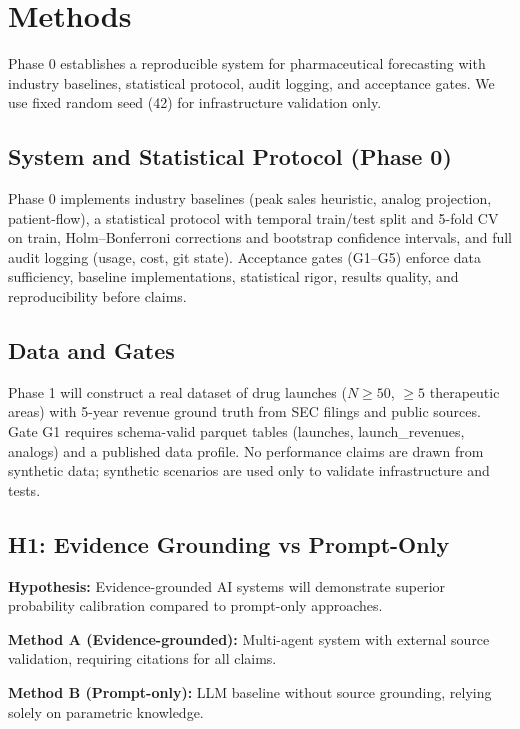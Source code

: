 \documentclass{article}
\begin{document}
\section{Methods}

Phase 0 establishes a reproducible system for pharmaceutical forecasting with industry baselines, statistical protocol, audit logging, and acceptance gates. We use fixed random seed (42) for infrastructure validation only.

\subsection{System and Statistical Protocol (Phase 0)}

Phase 0 implements industry baselines (peak sales heuristic, analog projection, patient-flow), a statistical protocol with temporal train/test split and 5-fold CV on train, Holm--Bonferroni corrections and bootstrap confidence intervals, and full audit logging (usage, cost, git state). Acceptance gates (G1--G5) enforce data sufficiency, baseline implementations, statistical rigor, results quality, and reproducibility before claims.

\subsection{Data and Gates}

Phase 1 will construct a real dataset of drug launches (\(N\geq 50\), \(\geq 5\) therapeutic areas) with 5-year revenue ground truth from SEC filings and public sources. Gate G1 requires schema-valid parquet tables (launches, launch\_revenues, analogs) and a published data profile. No performance claims are drawn from synthetic data; synthetic scenarios are used only to validate infrastructure and tests.

\subsection{H1: Evidence Grounding vs Prompt-Only}

\textbf{Hypothesis:} Evidence-grounded AI systems will demonstrate superior probability calibration compared to prompt-only approaches.

\textbf{Method A (Evidence-grounded):} Multi-agent system with external source validation, requiring citations for all claims.

\textbf{Method B (Prompt-only):} LLM baseline without source grounding, relying solely on parametric knowledge.
\end{document}
